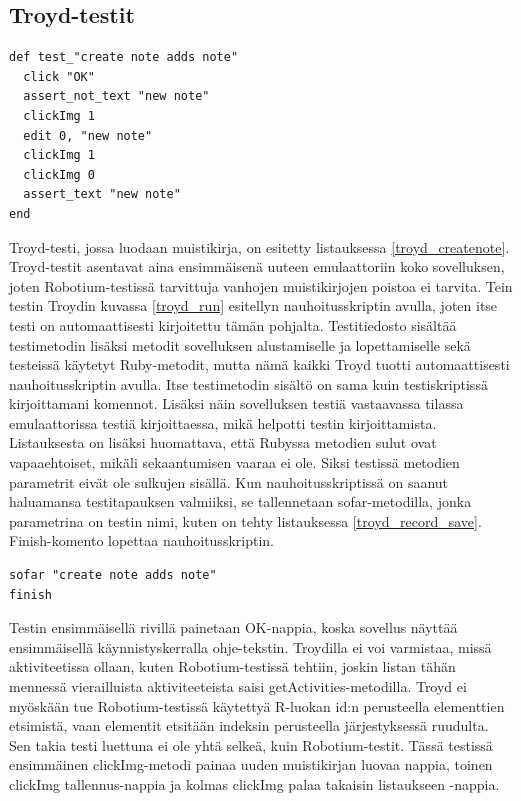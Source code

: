 \subsection{Troyd-testit}

\begin{lstlisting}[float, label=troyd_createnote,caption=Muistikirjan luontitesti Troydilla]
def test_"create note adds note"
  click "OK"
  assert_not_text "new note"
  clickImg 1
  edit 0, "new note"
  clickImg 1
  clickImg 0
  assert_text "new note"
end
\end{lstlisting}

Troyd-testi, jossa luodaan muistikirja, on esitetty listauksessa \ref{troyd_createnote}. Troyd-testit asentavat aina ensimmäisenä uuteen emulaattoriin koko sovelluksen, joten Robotium-testissä tarvittuja vanhojen muistikirjojen poistoa ei tarvita. Tein testin Troydin kuvassa \ref{troyd_run} esitellyn nauhoitusskriptin avulla, joten itse testi on automaattisesti kirjoitettu tämän pohjalta. Testitiedosto sisältää testimetodin lisäksi metodit sovelluksen alustamiselle ja lopettamiselle sekä testeissä käytetyt Ruby-metodit, mutta nämä kaikki Troyd tuotti automaattisesti nauhoitusskriptin avulla. Itse testimetodin sisältö on sama kuin testiskriptissä kirjoittamani komennot. Lisäksi näin sovelluksen testiä vastaavassa tilassa emulaattorissa testiä kirjoittaessa, mikä helpotti testin kirjoittamista. Listauksesta on lisäksi huomattava, että Rubyssa metodien sulut ovat vapaaehtoiset, mikäli sekaantumisen vaaraa ei ole. Siksi testissä metodien parametrit eivät ole sulkujen sisällä. Kun nauhoitusskriptissä on saanut haluamansa testitapauksen valmiiksi, se tallennetaan sofar-metodilla, jonka parametrina on testin nimi, kuten on tehty listauksessa \ref{troyd_record_save}. Finish-komento lopettaa nauhoitusskriptin.

\begin{lstlisting}[float, label=troyd_record_save,caption=Testin tallennus nauhoitusskriptistä Troydilla]
sofar "create note adds note"
finish
\end{lstlisting}

Testin ensimmäisellä rivillä painetaan OK-nappia, koska sovellus näyttää ensimmäisellä käynnistyskerralla ohje-tekstin. Troydilla ei voi varmistaa, missä aktiviteetissa ollaan, kuten Robotium-testissä tehtiin, joskin listan tähän mennessä vierailluista aktiviteeteista saisi getActivities-metodilla. Troyd ei myöskään tue Robotium-testissä käytettyä R-luokan id:n perusteella elementtien etsimistä, vaan elementit etsitään indeksin perusteella järjestyksessä ruudulta. Sen takia testi luettuna ei ole yhtä selkeä, kuin Robotium-testit. Tässä testissä ensimmäinen clickImg-metodi painaa uuden muistikirjan luovaa nappia, toinen clickImg tallennus-nappia ja kolmas clickImg palaa takaisin listaukseen -nappia.

